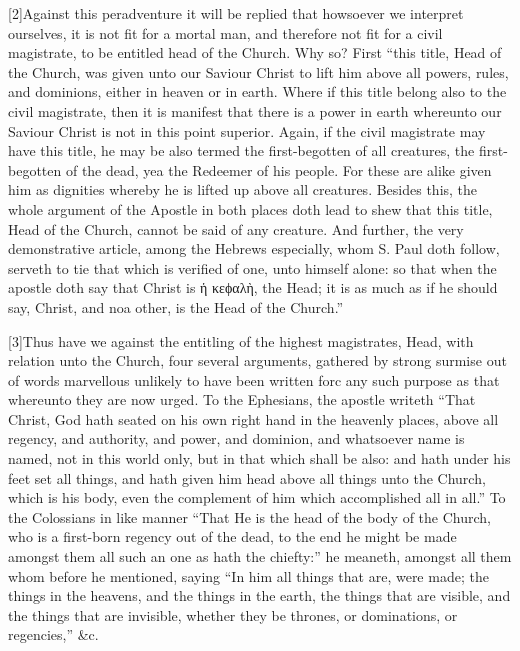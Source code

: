[2]Against this peradventure it will be replied that  howsoever we interpret ourselves, it is not fit for a mortal man, and therefore not fit for a civil magistrate, to be entitled head of the Church. Why so? First “this title, Head of the Church, was given unto our Saviour Christ to lift him above all powers, rules, and dominions, either in heaven or in earth. Where if this title belong also to the civil magistrate, then it is manifest that there is a power in earth whereunto our Saviour Christ is not in this point superior. Again, if the civil magistrate may have this title, he may be also termed the first-begotten of all creatures, the first-begotten of the dead, yea the Redeemer of his people. For these are alike given him as dignities whereby he is lifted up above all creatures. Besides this, the whole argument of the Apostle in both places doth lead to shew that this title, Head of the Church, cannot be said of any creature. And further, the very demonstrative article, among the Hebrews especially, whom S. Paul doth follow, serveth to tie that which is verified of one, unto himself alone: so that when the apostle doth say that Christ is  ἡ κεϕαλὴ, the Head; it is as much as if he should say, Christ, and noa other, is the Head of the Church.”

[3]Thus have we against the entitling of the highest magistrates, Head, with relation unto the Church, four several arguments, gathered by strong surmise out of words marvellous unlikely to have been written forc any such purpose as that whereunto they are now urged. To the Ephesians, the apostle writeth “That Christ, God hath seated on his own right hand in the heavenly places, above all regency, and authority, and power, and dominion, and whatsoever name is named, not in this world only, but in that which shall be also: and hath under his feet set all things, and hath given him head above all things unto the Church, which is his body, even the complement of him which accomplished all in all.” To the Colossians in like manner “That He is the head of the body of the Church, who is a first-born regency out of the dead, to the end he might be made amongst them all such an one as hath the chiefty:” he meaneth, amongst all them whom before he mentioned, saying “In him all things that are, were made; the things in the heavens, and the things in the earth, the things that are visible, and the things that are invisible, whether they be thrones, or dominations, or regencies,” \&c.

